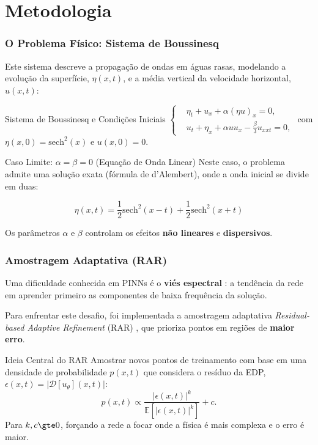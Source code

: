 \documentclass[usenames,dvipsnames,brazil,aspectratio=169]{beamer}
\begin{document}
\section{Metodologia}

\begin{frame}[t]
    \frametitle{O Problema Físico: Sistema de Boussinesq}
    Este sistema descreve a propagação de ondas em águas rasas, modelando a evolução da superfície, $\eta(x,t)$, e a média vertical da velocidade horizontal, $u(x,t)$:
    
    \begin{block}{Sistema de Boussinesq e Condições Iniciais}
        $
        \left\{
        \begin{aligned}
            &\eta_t + u_x + \alpha(\eta u)_x = 0, \\
            &u_t + \eta_x + \alpha u u_x - \tfrac{\beta}{3} u_{xxt} = 0,
        \end{aligned}
        \right.
        $
        com $\eta(x, 0) = \text{sech}^2(x)$ e $u(x, 0) = 0$.
    \end{block}

    \begin{block}{Caso Limite: $\alpha = \beta = 0$ (Equação de Onda Linear)}
        Neste caso, o problema admite uma solução exata (fórmula de d'Alembert), onde a onda inicial se divide em duas:

        $$ \eta(x,t) = \frac{1}{2}\text{sech}^2(x-t) + \frac{1}{2}\text{sech}^2(x+t) $$
    \end{block}
    
    Os parâmetros $\alpha$ e $\beta$ controlam os efeitos \textbf{não lineares} e \textbf{dispersivos}.
\end{frame}

\begin{frame}[t]
    \frametitle{Amostragem Adaptativa (RAR)}
    Uma dificuldade conhecida em PINNs é o \textbf{viés espectral} \cite{rahaman2019spectral}: a tendência da rede em aprender primeiro as componentes de baixa frequência da solução.
    
    Para enfrentar este desafio, foi implementada a amostragem adaptativa \textit{Residual-based Adaptive Refinement} (RAR) \parencite{wu2023comprehensive}, que prioriza pontos em regiões de \textbf{maior erro}.
    
    \begin{block}{Ideia Central do RAR}
       Amostrar novos pontos de treinamento com base em uma densidade de probabilidade $p(x,t)$ que considera o resíduo da EDP, $\epsilon(x,t) = |\mathcal{D}[u_\theta](x,t)|$:
       \begin{equation*}
        p(x,t) \propto \frac{|\epsilon(x,t)|^k}{\mathbb{E}[|\epsilon(x,t)|^k]} + c.
       \end{equation*}
       Para $k, c \gte 0$, forçando a rede a focar onde a física é mais complexa e o erro é maior.
    \end{block}
\end{frame}
\end{document}
